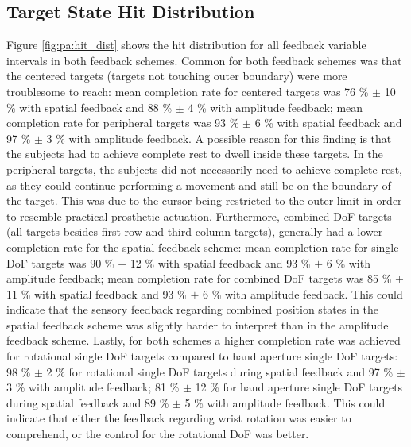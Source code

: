 \subsection{Target State Hit Distribution}
Figure \ref{fig:pa:hit_dist} shows the hit distribution for all feedback variable intervals in both feedback schemes. Common for both feedback schemes was that the centered  targets (targets not touching outer boundary) were more troublesome to reach: mean completion rate for centered targets was 76 \% $\pm$ 10 \% with spatial feedback and 88 \%  $\pm$ 4 \% with amplitude feedback; mean completion rate for peripheral targets was 93 \% $\pm$ 6 \% with spatial feedback and 97 \% $\pm$ 3 \% with amplitude feedback.
A possible reason for this finding is that the subjects had to achieve complete rest to dwell inside these targets. In the peripheral targets, the subjects did not necessarily need to achieve complete rest, as they could continue performing a movement and still be on the boundary of the target. This was due to the cursor being restricted to the outer limit in order to resemble practical prosthetic actuation.  
Furthermore, combined DoF targets (all targets besides first row and third column targets), generally had a lower completion rate for the spatial feedback scheme: mean completion rate for single DoF targets was 90 \% $\pm$ 12 \% with spatial feedback and 93 \% $\pm$ 6 \% with amplitude feedback; mean completion rate for combined DoF targets was 85 \% $\pm$ 11 \% with spatial feedback and 93 \% $\pm$ 6 \% with amplitude feedback. This could indicate that the sensory feedback regarding combined position states in the spatial feedback scheme was slightly harder to interpret than in the amplitude feedback scheme. 
Lastly, for both schemes a higher completion rate was achieved for rotational single DoF targets compared to hand aperture single DoF targets: 98 \% $\pm$ 2 \% for rotational single DoF targets during spatial feedback and 97 \% $\pm$ 3 \% with amplitude feedback; 81 \% $\pm$ 12 \% for hand aperture single DoF targets during spatial feedback and 89 \% $\pm$ 5 \% with amplitude feedback. This could indicate that either the feedback regarding wrist rotation was easier to comprehend, or the control for the rotational DoF was better.
